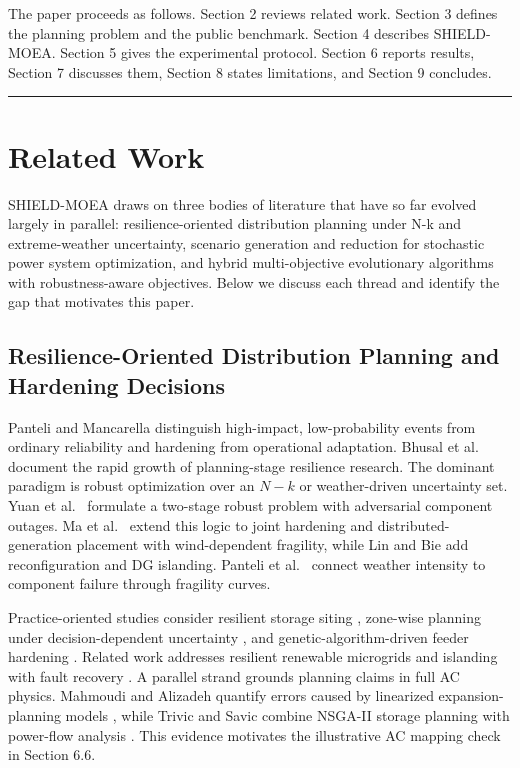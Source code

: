 \documentclass[energies,article,submit,moreauthors]{Definitions/mdpi}
\begin{document}
The paper proceeds as follows. Section 2 reviews related work. Section 3 defines the planning problem and the public benchmark. Section 4 describes SHIELD-MOEA. Section 5 gives the experimental protocol. Section 6 reports results, Section 7 discusses them, Section 8 states limitations, and Section 9 concludes.

\begin{center}\rule{0.5\linewidth}{0.5pt}\end{center}

\section{Related Work}\label{related-work}

SHIELD-MOEA draws on three bodies of literature that have so far evolved largely in parallel: resilience-oriented distribution planning under N-k and extreme-weather uncertainty, scenario generation and reduction for stochastic power system optimization, and hybrid multi-objective evolutionary algorithms with robustness-aware objectives. Below we discuss each thread and identify the gap that motivates this paper.

\subsection{Resilience-Oriented Distribution Planning and Hardening Decisions}\label{resilience-oriented-distribution-planning-and-hardening-decisions}

Panteli and Mancarella \cite{ref8} distinguish high-impact, low-probability events from ordinary reliability and hardening from operational adaptation. Bhusal et al.~\cite{ref9} document the rapid growth of planning-stage resilience research. The dominant paradigm is robust optimization over an \(N-k\) or weather-driven uncertainty set. Yuan et al.~\cite{ref3} formulate a two-stage robust problem with adversarial component outages. Ma et al.~\cite{ref5} extend this logic to joint hardening and distributed-generation placement with wind-dependent fragility, while Lin and Bie \cite{ref6} add reconfiguration and DG islanding. Panteli et al.~\cite{ref10} connect weather intensity to component failure through fragility curves.

Practice-oriented studies consider resilient storage siting \cite{ref11}, zone-wise planning under decision-dependent uncertainty \cite{ref12}, and genetic-algorithm-driven feeder hardening \cite{ref13}. Related work addresses resilient renewable microgrids \cite{ref14} and islanding with fault recovery \cite{ref15}. A parallel strand grounds planning claims in full AC physics. Mahmoudi and Alizadeh quantify errors caused by linearized expansion-planning models \cite{ref16}, while Trivic and Savic combine NSGA-II storage planning with power-flow analysis \cite{ref17}. This evidence motivates the illustrative AC mapping check in Section 6.6.
\end{document}
